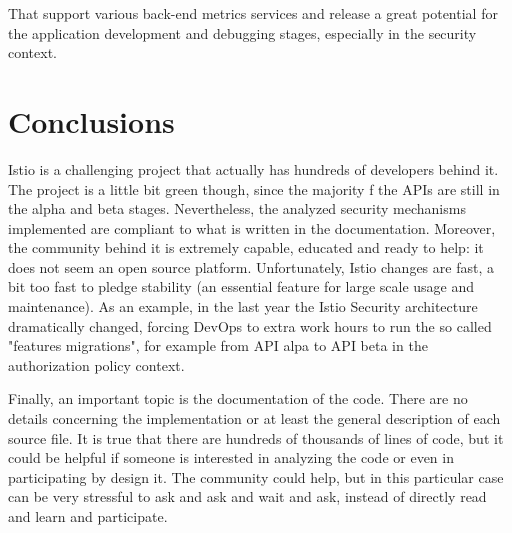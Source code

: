 \noindent That support various back-end metrics services and release a great potential for the application development and debugging stages, especially in the security context. 

\section{Conclusions}
Istio is a challenging project that actually has hundreds of developers behind it. The project is a little bit green though, since the majority f the APIs are still in the alpha and beta stages. Nevertheless, the analyzed security mechanisms implemented are compliant to what is written in the documentation. Moreover, the community behind it is extremely capable, educated and ready to help: it does not seem an open source platform. Unfortunately, Istio changes are fast, a bit too fast to pledge stability (an essential feature for large scale usage and maintenance). As an example, in the last year the Istio Security architecture dramatically changed, forcing DevOps to extra work hours to run the so called "features migrations", for example from API alpa to API beta in the authorization policy context.

Finally, an important topic is the documentation of the code. There are no details concerning the implementation or at least the general description of each source file. It is true that there are hundreds of thousands of lines of code, but it could be helpful if someone is interested in analyzing the code or even in participating by design it. The community could help, but in this particular case can be very stressful to ask and ask and wait and ask, instead of directly read and learn and participate.